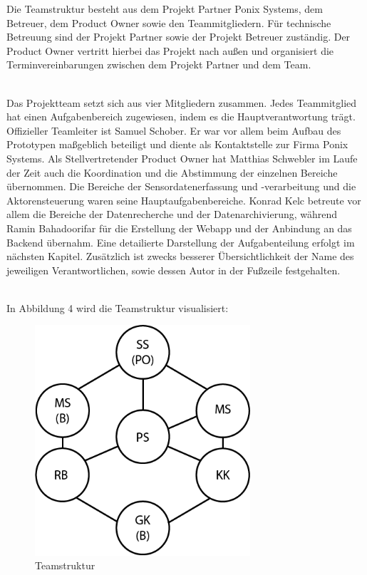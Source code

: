 Die Teamstruktur besteht aus dem Projekt Partner Ponix Systems, dem Betreuer, dem Product Owner sowie den Teammitgliedern. Für technische Betreuung sind der Projekt Partner sowie der Projekt Betreuer zuständig. Der Product Owner vertritt hierbei das Projekt nach außen und organisiert die Terminvereinbarungen zwischen dem Projekt Partner und dem Team.

\mbox{} \\ Das Projektteam setzt sich aus vier Mitgliedern zusammen. Jedes Teammitglied hat einen Aufgabenbereich zugewiesen, indem es die Hauptverantwortung trägt. Offizieller Teamleiter ist Samuel Schober. Er war vor allem beim Aufbau des Prototypen maßgeblich beteiligt und diente als Kontaktstelle zur Firma Ponix Systems. Als Stellvertretender Product Owner hat Matthias Schwebler im Laufe der Zeit auch die Koordination und die Abstimmung der einzelnen Bereiche übernommen. Die Bereiche der Sensordatenerfassung und -verarbeitung und die Aktorensteuerung waren seine Hauptaufgabenbereiche. Konrad Kelc betreute vor allem die Bereiche der Datenrecherche und der Datenarchivierung, während Ramin Bahadoorifar für die Erstellung der \gls{Webapp} und der Anbindung an das Backend übernahm. Eine detailierte Darstellung der Aufgabenteilung erfolgt im nächsten Kapitel. Zusätzlich ist zwecks besserer Übersichtlichkeit der Name des jeweiligen Verantwortlichen, sowie dessen Autor in der Fußzeile festgehalten.

\mbox{}\\In Abbildung 4 wird die Teamstruktur visualisiert:
\newpage

\begin{figure}[ht]
    \centering
	\includegraphics[width=8cm]{images/Teamstruktur_UrbanGreen}
    \caption{Teamstruktur}
\end{figure}\mbox{}\\

